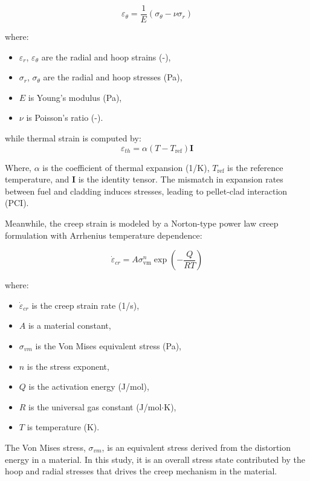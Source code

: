 \begin{equation}
    \varepsilon_\theta = \frac{1}{E} \left( \sigma_\theta - \nu \sigma_r \right)
\end{equation}

where:
\begin{itemize}
	\item $\varepsilon_r$, $\varepsilon_\theta$ are the radial and hoop strains (-),
	\item $\sigma_r$, $\sigma_\theta$ are the radial and hoop stresses (Pa),
	\item $E$ is Young’s modulus (Pa),
	\item $\nu$ is Poisson’s ratio (-).
\end{itemize}

while thermal strain is computed by:
\begin{equation}
    \varepsilon_{th}=\alpha\left(T-T_\text{ref}\right)\mathbf{I}
\end{equation}

Where,  $\alpha$ is the coefficient of thermal expansion (1/K), $T_\text{ref}$ is the reference temperature, and $\mathbf{I}$ is the identity tensor. The mismatch in expansion rates between fuel and cladding induces stresses, leading to pellet-clad interaction (PCI).

Meanwhile, the creep strain is modeled by a Norton-type power law creep formulation with Arrhenius temperature dependence:

\begin{equation}
    \dot{\varepsilon}_{cr}=A\sigma_{\text{vm}}^{n}\exp{\left(-\frac{Q}{RT}\right)}
\end{equation}

where:
\begin{itemize}
	\item ${\dot{\varepsilon}}_{cr}$ is the creep strain rate (1/s),
	\item $A$ is a material constant,
	\item $\sigma_{vm}$ is the Von Mises equivalent stress (Pa),
	\item $n$ is the stress exponent,
	\item $Q$ is the activation energy (J/mol),
	\item $R$ is the universal gas constant (J/mol$\cdot$K),
	\item $T$ is temperature (K).
\end{itemize}

The Von Mises stress, $\sigma_{vm}$, is an equivalent stress derived from the distortion energy in a material. In this study, it is an overall stress state contributed by the hoop and radial stresses that drives the creep mechanism in the material.

